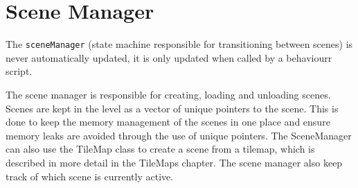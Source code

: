 \section{Scene Manager}
The \texttt{sceneManager} (state machine responsible for transitioning between scenes) is never automatically updated, it is only updated when called by a behaviourr script.

\noindent The scene manager is responsible for creating, loading and unloading scenes.
Scenes are kept in the level as a vector of unique pointers to the scene.
This is done to keep the memory management of the scenes in one place and ensure memory leaks are avoided through the use of unique pointers.
The SceneManager can also use the TileMap class to create a scene from a tilemap, which is described in more detail in the TileMaps chapter.
The scene manager also keep track of which scene is currently active.